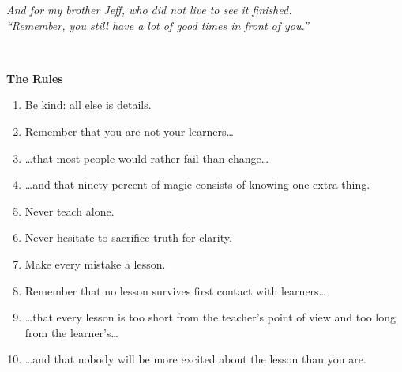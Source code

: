\documentclass[10pt,statementpaper]{memoir}
\begin{document}
\vspace*{3\baselineskip}

\begin{center}
{\em
And for my brother Jeff, who did not live to see it finished.\\
``Remember, you still have a lot of good times in front of you.''
}
\end{center}

\newpage

\pagestyle{empty}

~

\newpage

\pagestyle{empty}

\vspace*{6\baselineskip}

\begin{center}{\large \textbf{The Rules}}\end{center}

\begin{enumerate}

\item Be kind: all else is details.

\item Remember that you are not your learners{\ldots}

\item {\ldots}that most people would rather fail than change{\ldots}

\item {\ldots}and that ninety percent of magic consists of knowing one extra thing.

\item Never teach alone.

\item Never hesitate to sacrifice truth for clarity.

\item Make every mistake a lesson.

\item Remember that no lesson survives first contact with learners{\ldots}

\item {\ldots}that every lesson is too short from the teacher's point of view and too long from the learner's{\ldots}

\item {\ldots}and that nobody will be more excited about the lesson than you are.

\end{enumerate}

\newpage

\pagestyle{empty}

~

\newpage

\tableofcontents

\newpage

\pagestyle{empty}

~

\newpage
\listoffigures

\newpage
\pagestyle{empty}

~

\newpage

\pagestyle{plain}


\end{document}
